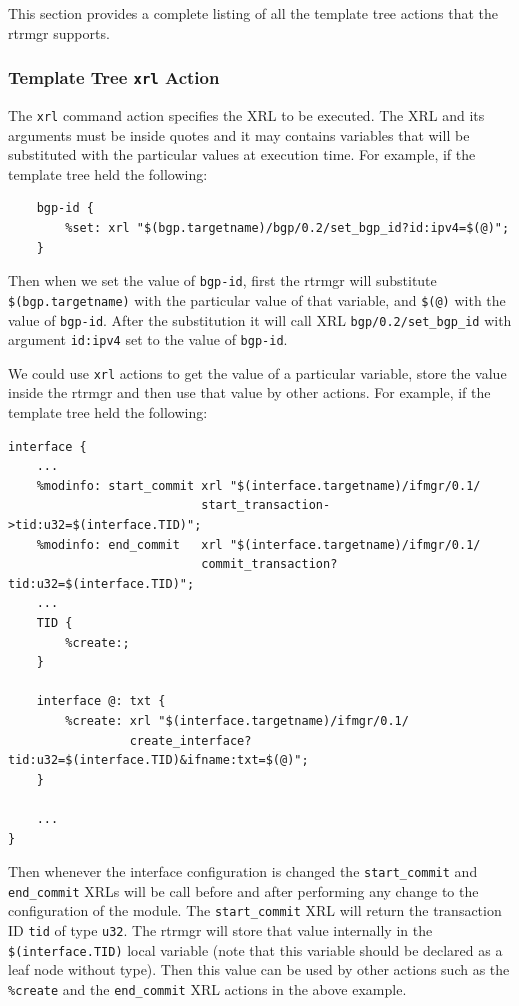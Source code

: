 \documentclass[11pt]{article}
\begin{document}
This section provides a complete listing of all the template tree
actions that the rtrmgr supports.

\subsubsection{Template Tree {\tt xrl} Action}

The {\tt xrl} command action specifies the XRL to be executed. The XRL
and its arguments must be inside quotes and it may contains variables
that will be substituted with the particular values at execution time.
For example, if the template tree held the following:

\begin{verbatim}
    bgp-id {
        %set: xrl "$(bgp.targetname)/bgp/0.2/set_bgp_id?id:ipv4=$(@)";
    }
\end{verbatim}

Then when we set the value of {\tt bgp-id}, first the rtrmgr will substitute
{\tt \$(bgp.targetname)} with the particular value of that variable, and
{\tt \$(@)} with the value of {\tt bgp-id}. After the substitution it will
call XRL {\tt bgp/0.2/set\_bgp\_id} with argument {\tt id:ipv4} set to the
value of {\tt bgp-id}.

We could use {\tt xrl} actions to get the value of a particular variable,
store the value inside the rtrmgr and then use that value by other actions.
For example, if the template tree held the following:

\begin{verbatim}
interface {
    ...
    %modinfo: start_commit xrl "$(interface.targetname)/ifmgr/0.1/
                           start_transaction->tid:u32=$(interface.TID)";
    %modinfo: end_commit   xrl "$(interface.targetname)/ifmgr/0.1/
                           commit_transaction?tid:u32=$(interface.TID)";
    ...
    TID {
        %create:;
    }

    interface @: txt {
        %create: xrl "$(interface.targetname)/ifmgr/0.1/
                 create_interface?tid:u32=$(interface.TID)&ifname:txt=$(@)";
    }

    ...
}
\end{verbatim}

Then whenever the interface configuration is changed the {\tt start\_commit}
and {\tt end\_commit} XRLs will be call before and after performing any change
to the configuration of the module. The {\tt start\_commit} XRL will return
the transaction ID {\tt tid} of type {\tt u32}. The rtrmgr will store
that value internally in the {\tt \$(interface.TID)} local variable
(note that this variable should be declared as a leaf node without type).
Then this value can be used by other actions such as the
{\tt \%create} and the {\tt end\_commit} XRL actions in the above example.
\end{document}
